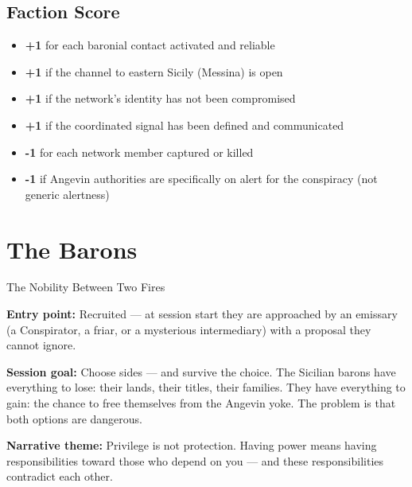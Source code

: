 \subsection{Faction Score}

\begin{itemize}[nosep]
  \item \textbf{+1} for each baronial contact activated and reliable
  \item \textbf{+1} if the channel to eastern Sicily (Messina) is open
  \item \textbf{+1} if the network's identity has not been compromised
  \item \textbf{+1} if the coordinated signal has been defined and communicated
  \item \textbf{-1} for each network member captured or killed
  \item \textbf{-1} if Angevin authorities are specifically on alert
    for the conspiracy (not generic alertness)
\end{itemize}


\secsep

\section{The Barons}
\textcolor{oro}{\cinzel\large The Nobility Between Two Fires}

\filetto

\textbf{Entry point:} Recruited --- at session start they are approached
by an emissary (a Conspirator, a friar, or a mysterious intermediary)
with a proposal they cannot ignore.

\textbf{Session goal:} Choose sides --- and survive the choice. The
Sicilian barons have everything to lose: their lands, their titles,
their families. They have everything to gain: the chance to free
themselves from the Angevin yoke. The problem is that both options
are dangerous.

\textbf{Narrative theme:} Privilege is not protection. Having power
means having responsibilities toward those who depend on you --- and
these responsibilities contradict each other.

